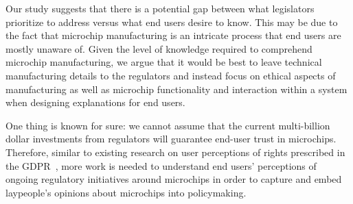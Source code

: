 Our study suggests that there is a potential gap between what legislators prioritize to address versus what end users desire to know. 
This may be due to the fact that microchip manufacturing is an intricate process that end users are mostly unaware of.
Given the level of knowledge required to comprehend microchip manufacturing, we argue that it would be best to leave technical manufacturing details to the regulators and instead focus on ethical aspects of manufacturing as well as microchip functionality and interaction within a system when designing explanations for end users.

One thing is known for sure: we cannot assume that the current multi-billion dollar investments from regulators will guarantee end-user trust in microchips. 
Therefore, similar to existing research on user perceptions of rights prescribed in the \ac{GDPR}~\cite{DBLP:conf/chi/KyiMSRB24,DBLP:conf/IEEEares/ManginiTM20,strycharz2020data,DBLP:conf/soups/KaushikYD021}, more work is needed to understand end users' perceptions of ongoing regulatory initiatives around microchips in order to capture and embed laypeople's opinions about microchips into policymaking. 
